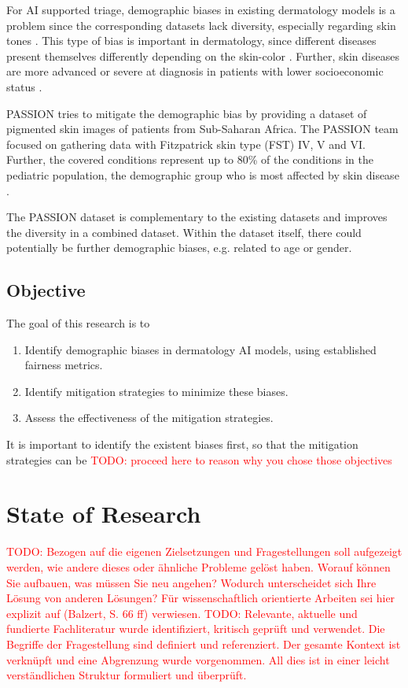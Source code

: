 \documentclass[a4paper,10.5pt,
			   bindingoffset=0.2in,left=3.35cm,right=2.12cm,top=3.75cm,bottom=2.88cm,%
				footskip=.25in
				listof=numbered,toc=chapterentrywithdots]{scrreport}
\renewcommand{\todo}[1]{\textcolor{red}{TODO: #1}}
\begin{document}
			For AI supported triage, demographic biases in existing dermatology models is a problem since the corresponding datasets lack diversity, especially regarding skin tones \autocite{Gottfrois2024}. This type of bias is important in dermatology, since different diseases present themselves differently depending on the skin-color \autocite{Diaz2022}. Further, skin diseases are more advanced or severe at diagnosis in patients with lower socioeconomic status \autocite{BAD2021}.
			
			PASSION tries to mitigate the demographic bias by providing a dataset of pigmented skin images of patients from Sub-Saharan Africa. The PASSION team focused on gathering data with Fitzpatrick skin type (\gls{FST}) IV, V and VI. Further, the covered conditions represent up to 80\% of the conditions in the \gls{pediatric} population, the demographic group who is most affected by skin disease \autocite{Gottfrois2024}.
			
			The PASSION dataset is complementary to the existing datasets and improves the diversity in a combined dataset. Within the dataset itself, there could potentially be further demographic biases, e.g. related to age or gender.
			 
		\section{Objective}
		The goal of this research is to
		\begin{enumerate}
			\item Identify demographic biases in dermatology AI models, using established fairness metrics.
			\item Identify mitigation strategies to minimize these biases.
			\item Assess the effectiveness of the mitigation strategies.
		\end{enumerate}
		It is important to identify the existent biases first, so that the mitigation strategies can be \todo{proceed here to reason why you chose those objectives}
		
	
	\chapter{State of Research}
		\todo{Bezogen auf die eigenen Zielsetzungen und Fragestellungen soll aufgezeigt werden, wie andere dieses oder ähnliche Probleme gelöst haben. Worauf können Sie aufbauen, was müssen Sie neu angehen?	Wodurch unterscheidet sich Ihre Lösung von anderen Lösungen? Für wissenschaftlich orientierte Arbeiten sei hier explizit auf (Balzert, S. 66 ff) verwiesen.}
		\todo{Relevante, aktuelle und fundierte Fachliteratur wurde identifiziert, kritisch geprüft und verwendet. Die Begriffe der Fragestellung sind definiert und referenziert. Der gesamte Kontext ist verknüpft und eine Abgrenzung wurde vorgenommen. All dies ist in einer leicht verständlichen Struktur formuliert und überprüft.}
	
\end{document}

